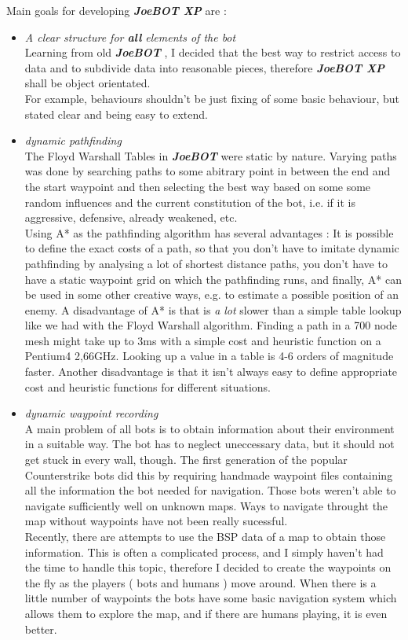 \documentclass[12pt]{article}
\newcommand {\joebotxp}{\textit{\textbf{JoeBOT XP}} }
\newcommand {\joebot}{\textit{\textbf{JoeBOT}} }
\begin{document}
Main goals for developing \joebotxp are :
\begin {itemize}

\item \textit{A clear structure for \textbf{all} elements of the bot}\\
Learning from old \joebot, I decided that the best way to restrict access to data and to subdivide data into reasonable pieces, therefore \joebotxp shall be object orientated.\\
For example, behaviours shouldn't be just fixing of some basic behaviour, but stated clear and being easy to extend.

\item \textit{dynamic pathfinding}\\
The Floyd Warshall Tables in \joebot were static by nature. Varying paths was done by searching paths to some abitrary point in between the end and the start waypoint and then selecting the best way based on some some random influences and the current constitution of the bot, i.e. if it is aggressive, defensive, already weakened, etc.\\
Using A* as the pathfinding algorithm has several advantages : It is possible to define the exact costs of a path, so that you don't have to imitate dynamic pathfinding by analysing a lot of shortest distance paths, you don't have to have a static waypoint grid on which the pathfinding runs, and finally, A* can be used in some other creative ways, e.g. to estimate a possible position of an enemy. A disadvantage of A* is that is \textit{a lot} slower than a simple table lookup like we had with the Floyd Warshall algorithm. Finding a path in a 700 node mesh might take up to 3ms with a simple cost and heuristic function on a Pentium4 2,66GHz. Looking up a value in a table is 4-6 orders of magnitude faster. Another disadvantage is that it isn't always easy to define appropriate cost and heuristic functions for different situations.

\item \textit{dynamic waypoint recording}\\
A main problem of all bots is to obtain information about their environment in a suitable way. The bot has to neglect uneccessary data, but it should not get stuck in every wall, though. The first generation of the popular Counterstrike bots did this by requiring handmade waypoint files containing all the information the bot needed for navigation. Those bots weren't able to navigate sufficiently well on unknown maps. Ways to navigate throught the map without waypoints have not been really sucessful.\\
Recently, there are attempts to use the BSP data of a map to obtain those information. This is often a complicated process, and I simply haven't had the time to handle this topic, therefore I decided to create the waypoints on the fly as the players ( bots and humans ) move around. When there is a little number of waypoints the bots have some basic navigation system which allows them to explore the map, and if there are humans playing, it is even better.


\end{itemize}
\end{document}
